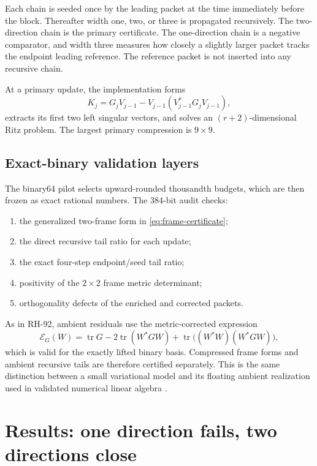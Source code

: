 \documentclass[11pt]{article}
\theoremstyle{definition}
\theoremstyle{remark}
\newcommand{\tr}{\operatorname{tr}}
\newcommand{\E}{\mathcal E}
\begin{document}
Each chain is seeded once by the leading packet at the time immediately
before the block.  Thereafter width one, two, or three is propagated
recursively.  The two-direction chain is the primary certificate.  The
one-direction chain is a negative comparator, and width three measures how
closely a slightly larger packet tracks the endpoint leading reference.
The reference packet is not inserted into any recursive chain.

At a primary update, the implementation forms
\[
 K_j=G_jV_{j-1}-V_{j-1}(V_{j-1}^*G_jV_{j-1}),
\]
extracts its first two left singular vectors, and solves an
$(r+2)$-dimensional Ritz problem.  The largest primary compression is
$9\times9$.

\subsection{Exact-binary validation layers}

The binary64 pilot selects upward-rounded thousandth budgets, which are then
frozen as exact rational numbers.  The 384-bit audit checks:

\begin{enumerate}[leftmargin=2em]
\item the generalized two-frame form in \eqref{eq:frame-certificate};
\item the direct recursive tail ratio for each update;
\item the exact four-step endpoint/seed tail ratio;
\item positivity of the $2\times2$ frame metric determinant;
\item orthogonality defects of the enriched and corrected packets.
\end{enumerate}

As in RH-92, ambient residuals use the metric-corrected expression
\begin{equation}
 \E_G(W)=\tr G-2\tr(W^*GW)
 +\tr\bigl((W^*W)(W^*GW)\bigr),
 \label{eq:metric-tail}
\end{equation}
which is valid for the exactly lifted binary basis.  Compressed frame forms
and ambient recursive tails are therefore certified separately.  This is the
same distinction between a small variational model and its floating ambient
realization used in validated numerical linear algebra
\citep{Higham2002,Rump2010}.

\section{Results: one direction fails, two directions close}
\end{document}
